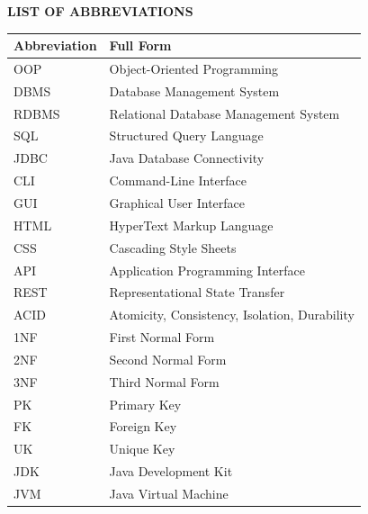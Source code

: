 \documentclass[12pt,a4paper]{report}
\begin{document}
\newpage

\tableofcontents
\newpage
\listoffigures
\listoftables
\newpage

\begin{center}
{\Large \textbf{LIST OF ABBREVIATIONS}\par}
\end{center}
\vspace{0.4cm}

\begin{table}[h]
\centering
\begin{tabular}{ll}
\toprule
\textbf{Abbreviation} & \textbf{Full Form} \\
\midrule
OOP & Object-Oriented Programming \\
DBMS & Database Management System \\
RDBMS & Relational Database Management System \\
SQL & Structured Query Language \\
JDBC & Java Database Connectivity \\
CLI & Command-Line Interface \\
GUI & Graphical User Interface \\
HTML & HyperText Markup Language \\
CSS & Cascading Style Sheets \\
API & Application Programming Interface \\
REST & Representational State Transfer \\
ACID & Atomicity, Consistency, Isolation, Durability \\
1NF & First Normal Form \\
2NF & Second Normal Form \\
3NF & Third Normal Form \\
PK & Primary Key \\
FK & Foreign Key \\
UK & Unique Key \\
JDK & Java Development Kit \\
JVM & Java Virtual Machine \\
\bottomrule
\end{tabular}
\end{table}

\newpage

\setcounter{page}{1}
\end{document}
